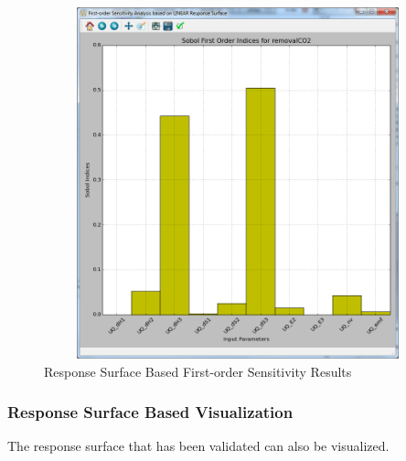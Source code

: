 \begin{figure}[H]
	\centering \includegraphics[width=6.5in,height=4in,keepaspectratio]{Chapt_uq/figs/tutorial/25_RSSobol1Results}
	\caption{Response Surface Based First-order Sensitivity Results}
	\label{fig:uqt_rssa_results}
\end{figure}

\subsubsection{Response Surface Based Visualization}

The response surface that has been validated can also be visualized.

